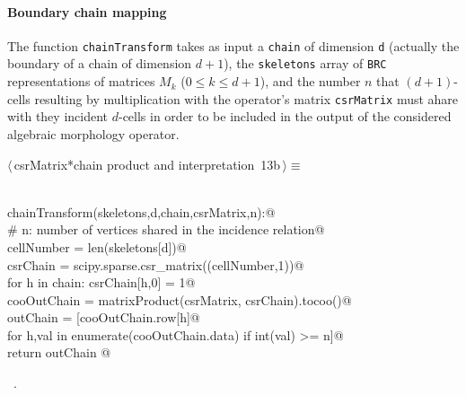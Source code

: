 \documentclass[11pt,oneside]{article}	%
\begin{document}
\paragraph{Boundary chain mapping}
The function \texttt{chainTransform} takes as input a \texttt{chain} of dimension \texttt{d} (actually the boundary of a chain of dimension $d+1$), the \texttt{skeletons} array of \texttt{BRC} representations of matrices $M_k$ ($0\leq k\leq d+1$), and the number $n$ that $(d+1)$-cells resulting by multiplication with the operator's matrix \texttt{csrMatrix} must ahare with they incident $d$-cells in order to be included in the output of the considered algebraic morphology operator.

\begin{flushleft} \small
\begin{minipage}{\linewidth} \label{scrap21}
\protect{}$\langle\,$csrMatrix*chain product and interpretation\nobreak\ {\footnotesize 13b}$\,\rangle\equiv$
\vspace{-1ex}
\begin{list}{}{} \item
\mbox{}\verb@@\\
\mbox{}\verb@def chainTransform(skeletons,d,chain,csrMatrix,n):@\\
\mbox{}\verb@   # n: number of vertices shared in the incidence relation@\\
\mbox{}\verb@   cellNumber = len(skeletons[d])@\\
\mbox{}\verb@   csrChain = scipy.sparse.csr_matrix((cellNumber,1))@\\
\mbox{}\verb@   for h in chain: csrChain[h,0] = 1@\\
\mbox{}\verb@   cooOutChain = matrixProduct(csrMatrix, csrChain).tocoo()@\\
\mbox{}\verb@   outChain = [cooOutChain.row[h]@\\
\mbox{}\verb@      for h,val in enumerate(cooOutChain.data) if int(val) >= n]@\\
\mbox{}\verb@   return outChain @\\
\mbox{}\verb@@{\NWsep}
\end{list}
\vspace{-1ex}
\footnotesize\addtolength{\baselineskip}{-1ex}
\begin{list}{}{\setlength{\itemsep}{-\parsep}\setlength{\itemindent}{-\leftmargin}}
\item \NWtxtMacroRefIn\ .
\end{list}
\end{minipage}\\[4ex]
\end{flushleft}
\end{document}

